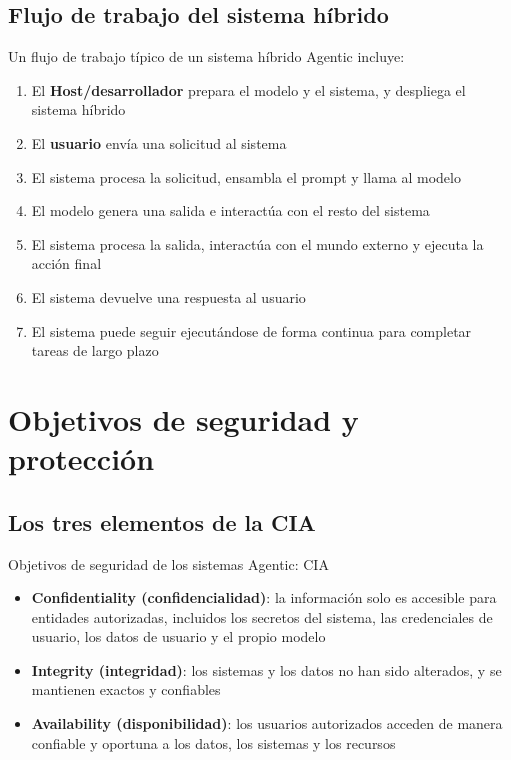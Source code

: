 \documentclass[a4paper]{article}
\begin{document}
\subsection{Flujo de trabajo del sistema híbrido}

Un flujo de trabajo típico de un sistema híbrido Agentic incluye:
\begin{enumerate}
    \item El \textbf{Host/desarrollador} prepara el modelo y el sistema, y despliega el sistema híbrido
    \item El \textbf{usuario} envía una solicitud al sistema
    \item El sistema procesa la solicitud, ensambla el prompt y llama al modelo
    \item El modelo genera una salida e interactúa con el resto del sistema
    \item El sistema procesa la salida, interactúa con el mundo externo y ejecuta la acción final
    \item El sistema devuelve una respuesta al usuario
    \item El sistema puede seguir ejecutándose de forma continua para completar tareas de largo plazo
\end{enumerate}

\section{Objetivos de seguridad y protección}

\subsection{Los tres elementos de la CIA}

\begin{importantbox}{Objetivos de seguridad de los sistemas Agentic: CIA}
\begin{itemize}
    \item \textbf{Confidentiality (confidencialidad)}: la información solo es accesible para entidades autorizadas, incluidos los secretos del sistema, las credenciales de usuario, los datos de usuario y el propio modelo
    \item \textbf{Integrity (integridad)}: los sistemas y los datos no han sido alterados, y se mantienen exactos y confiables
    \item \textbf{Availability (disponibilidad)}: los usuarios autorizados acceden de manera confiable y oportuna a los datos, los sistemas y los recursos
\end{itemize}
\end{importantbox}
\end{document}
